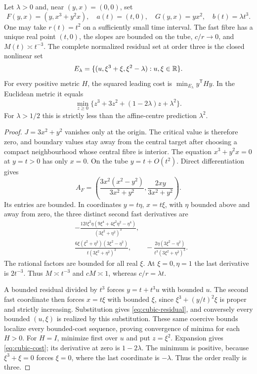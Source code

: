 \begin{proposition}\label{prop:nonlinear-wall}
Let $\lambda>0$ and, near $(y,x)=(0,0)$, set
\[
 F(y,x)=(y,x^3+y^2x),\quad a(t)=(t,0),\quad
 G(y,x)=yx^2,\quad b(t)=\lambda t^3.
\]
One may take $r(t)=t^2$ on a sufficiently small time interval. The fast fibre
has a unique real point $(t,0)$, the slopes are bounded on the tube,
$c/r\to0$, and $M(t)\asymp t^{-3}$. The complete normalized residual set
at order three is the closed nonlinear set
\begin{equation}\label{eq:cubic-residual}
 E_\lambda=\{(u,\xi^3+\xi,\xi^2-\lambda):u,\xi\in\mathbb R\}.
\end{equation}
For every positive metric $H$, the squared leading cost is
$\min_{E_\lambda}y^{\mathsf T}Hy$. In the Euclidean metric it equals
\begin{equation}\label{eq:cubic-cost}
 \min_{z\ge0}\{z^3+3z^2+(1-2\lambda)z+\lambda^2\}.
\end{equation}
For $\lambda>1/2$ this is strictly less than the affine-centre prediction
$\lambda^2$.
\end{proposition}
\begin{proof}
$J=3x^2+y^2$ vanishes only at the origin. The critical value is therefore
zero, and boundary values stay away from the central target after choosing
a compact neighbourhood whose central fibre is interior. The equation
$x^3+y^2x=0$ at $y=t>0$ has only $x=0$. On the tube $y=t+O(t^2)$.
Direct differentiation gives
\[
 A_F=\left(\frac{3x^2(x^2-y^2)}{3x^2+y^2},
                \frac{2xy}{3x^2+y^2}\right).
\]
Its entries are bounded. In coordinates $y=t\eta$, $x=t\xi$, with
$\eta$ bounded above and away from zero, the three distinct second fast
derivatives are
\begin{align*}
 &-\frac{12t\xi^2\eta(9\xi^4+4\xi^2\eta^2-\eta^4)}
              {(3\xi^2+\eta^2)^3},\\
 &\frac{6\xi(\xi^2+\eta^2)(3\xi^2-\eta^2)}
              {t(3\xi^2+\eta^2)^3},\qquad
 -\frac{2\eta(3\xi^2-\eta^2)}{t^3(3\xi^2+\eta^2)^3}.
\end{align*}
The rational factors are bounded for all real $\xi$. At $\xi=0,\eta=1$
the last derivative is $2t^{-3}$. Thus $M\asymp t^{-3}$ and
$cM\asymp1$, whereas $c/r=\lambda t$.

A bounded residual divided by $t^3$ forces $y=t+t^3u$ with bounded $u$.
The second fast coordinate then forces $x=t\xi$ with bounded $\xi$, since
$\xi^3+(y/t)^2\xi$ is proper and strictly increasing. Substitution gives
\eqref{eq:cubic-residual}, and conversely every bounded $(u,\xi)$ is
realized by this substitution. These same coercive bounds localize every
bounded-cost sequence, proving convergence of minima for each $H>0$.
For $H=I$, minimize first over $u$ and put $z=\xi^2$. Expansion gives
\eqref{eq:cubic-cost}; its derivative at zero is $1-2\lambda$.
The minimum is positive, because $\xi^3+\xi=0$ forces $\xi=0$, where the
last coordinate is $-\lambda$. Thus the order really is three.
\end{proof}
